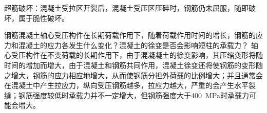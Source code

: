 \documentclass{article}
\begin{document}
\begin{questionList}
      \par 超筋破坏：混凝土受拉区开裂后，混凝土受压区压碎时，钢筋仍未屈服，随即破坏，属于脆性破坏。
      \item 钢筋混凝土轴心受压构件在长期荷载作用下，随着荷载作用时间的增长，钢筋的应力和混凝土的应力各发生什么变化？混凝土的徐变是否会影响短柱的承载力？
      \ans 轴心受压构件在不变荷载的长期作用下，由于混凝凝土的徐变影响，其压缩变形将随时间的增加而增大，由于混凝土和钢筋共同作用，混凝土徐变还将使钢筋的变形随之增大，钢筋的应力相应地增大，从而使钢筋分担外荷载的比例增大；并且通常会在混凝土中产生拉应力，纵向受压钢筋越多，拉应力越大，严重的会产生水平裂缝；钢筋强度较低时承载力并不一定增大，但钢筋强度大于\SI{400}{\MPa}时承载力可能会增大。
\end{questionList}
\end{document}
